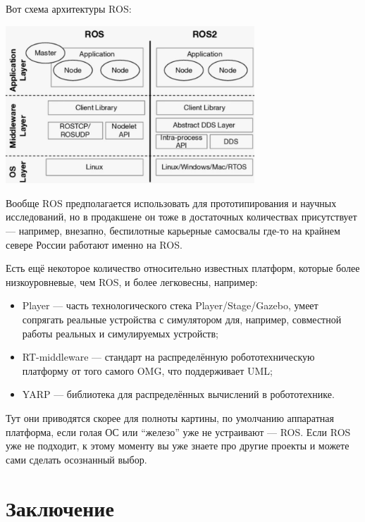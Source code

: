 \documentclass{../../text-style}
\begin{document}
Вот схема архитектуры ROS:

\begin{center}
    \includegraphics[width=0.7\textwidth]{ros.png}
\end{center}

Вообще ROS предполагается использовать для прототипирования и научных исследований, но в продакшене он тоже в достаточных количествах присутствует --- например, внезапно, беспилотные карьерные самосвалы где-то на крайнем севере России работают именно на ROS.

Есть ещё некоторое количество относительно известных платформ, которые более низкоуровневые, чем ROS, и более легковесны, например:

\begin{itemize}
    \item Player --- часть технологического стека Player/Stage/Gazebo, умеет сопрягать реальные устройства с симулятором для, например, совместной работы реальных и симулируемых устройств;
    \item RT-middleware --- стандарт на распределённую робототехническую платформу от того самого OMG, что поддерживает UML;
    \item YARP --- библиотека для распределённых вычислений в робототехнике.
\end{itemize}

Тут они приводятся скорее для полноты картины, по умолчанию аппаратная платформа, если голая ОС или \enquote{железо} уже не устраивают --- ROS. Если ROS уже не подходит, к этому моменту вы уже знаете про другие проекты и можете сами сделать осознанный выбор.

\section*{Заключение}
\end{document}
